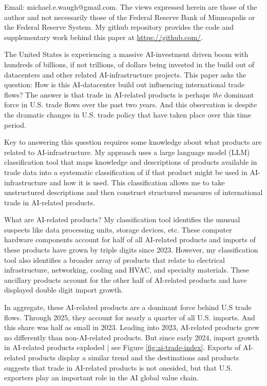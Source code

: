 \documentclass[12pt,pdftex]{article}
\begin{document}
\begin{onehalfspacing}

\vspace{3.0cm}

{\footnotesize Email: michael.e.waugh@gmail.com. The views expressed herein are those of the author and not necessarily those of the Federal Reserve Bank of Minneapolis or the Federal Reserve System. My github repository provides the code and supplementary work behind this paper at \url{https://github.com/}.}

\hspace{-0.05cm}

\newpage

The United States is experiencing a massive AI-investment driven boom with hundreds of billions, if not trillions, of dollars being invested in the build out of datacenters and other related AI-infrastructure projects. This paper asks the question: How is this AI-datacenter build out influencing international trade flows? The answer is that trade in AI-related products is perhaps \emph{the} dominant force in U.S. trade flows over the past two years. And this observation is despite the dramatic changes in U.S. trade policy that have taken place over this time period. 

Key to answering this question requires some knowledge about what products are related to AI-infrastructure. My approach uses a large language model (LLM) classification tool that maps knowledge and descriptions of products available in trade data into a systematic classification of if that product might be used in AI-infrastructure and how it is used. This classification allows me to take unstructured descriptions and then construct structured measures of international trade in AI-related products.

What are AI-related products? My classification tool identifies the unusual suspects like data processing units, storage devices, etc. These computer hardware components account for half of all AI-related products and imports of these products have grown by triple digits since 2023. However, my classification tool also identifies a broader array of products that relate to electrical infrastructure, networking, cooling and HVAC, and specialty materials. These ancillary products account for the other half of AI-related products and have displayed double digit import growth.  

In aggregate, these AI-related products are a dominant force behind U.S trade flows. Through 2025, they account for nearly a quarter of all U.S. imports. And this share was half as small in 2023. Leading into 2023, AI-related products grew no differently than non-AI-related products. But since early 2024, import growth in AI-related products exploded | see Figure \ref{fig:ai-trade-index}. Exports of AI-related products display a similar trend and the destinations and products suggests that trade in AI-related products is not onesided, but that U.S. exporters play an important role in the AI global value chain.


\end{onehalfspacing}
\end{document}
